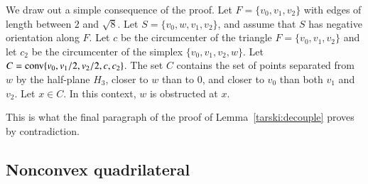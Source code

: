 \begin{tarskidata}
\begin{tarski}

\begin{lemma}
We draw out a simple consequence of the proof.
Let
$F=\{v_0,v_1,v_2\}$ with edges of length between $2$ and $\sqrt8$.
Let $S=\{v_0,w,v_1,v_2\}$, and assume that $S$ has negative
orientation along $F$. Let $c$ be the circumcenter of the triangle
$F=\{v_0,v_1,v_2\}$ and let $c_2$ be the circumcenter of the simplex
$\{v_0,v_1,v_2,w\}$. Let
$C={\operatorname{conv}}\{v_0,v_1/2,v_2/2,c,c_2\}$.  The set $C$ contains the set of points
separated from $w$ by the half-plane $H_3$, closer to $w$ than to
$0$, and closer to $v_0$ than both $v_1$ and $v_2$. Let $x\in C$.
In this context, $w$ is obstructed at $x$.
\end{lemma}

\begin{proved} This is what the final paragraph of the  proof of Lemma~\ref{tarski:decouple} proves by contradiction.
\swallowed\end{proved}
\end{tarski}



















\begin{tarski}
\section{Nonconvex quadrilateral}


\end{tarski}
\end{tarskidata}
